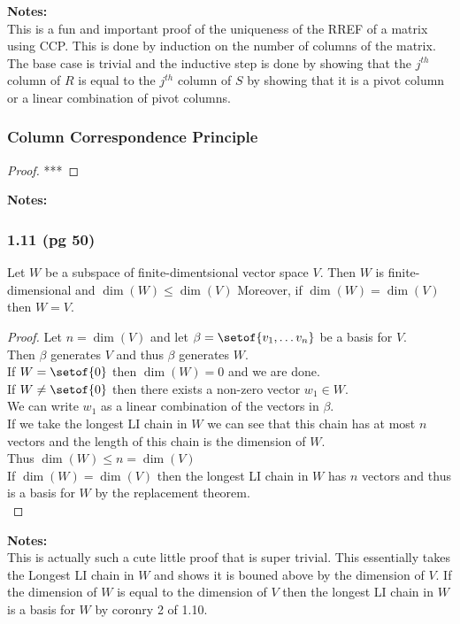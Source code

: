 \documentclass[answers,12pt,addpoints]{exam}
\begin{document}
\textbf{Notes:}\\
This is a fun and important proof of the uniqueness of the RREF of a matrix using CCP. This is done by induction on the number of columns of the matrix. The base case is trivial and the inductive step is done by showing that the $j^{th}$ column of $R$ is equal to the $j^{th}$ column of $S$ by showing that it is a pivot column or a linear combination of pivot columns.\\

\subsubsection{Column Correspondence Principle}
\begin{proof}
    ***
\end{proof}
\textbf{Notes:}\\


\subsubsection{1.11 (pg 50)}
Let $W$ be a subspace of finite-dimentsional vector space $V$. Then $W$ is finite-dimensional and $\dim(W) \leq \dim(V)$ Moreover, if $\dim(W) = \dim(V)$ then $W = V$.
\begin{proof}
    Let $n = \dim(V)$ and let $\beta = \setof{v_1, \dots v_n}$ be a basis for $V$.\\
    Then $\beta$ generates $V$ and thus $\beta$ generates $W$.\\
    If $W = \setof{0}$ then $\dim(W) = 0$ and we are done.\\
    If $W \neq \setof{0}$ then there exists a non-zero vector $w_1 \in W$.\\
    We can write $w_1$ as a linear combination of the vectors in $\beta$.\\
    If we take the longest LI chain in $W$ we can see that this chain has at most $n$ vectors and the length of this chain is the dimension of $W$.\\
    Thus $\dim(W) \leq n = \dim(V)$\\
    If $\dim(W) = \dim(V)$ then the longest LI chain in $W$ has $n$ vectors and thus is a basis for $W$ by the replacement theorem.\\
\end{proof}
\textbf{Notes:}\\
This is actually such a cute little proof that is super trivial. This essentially takes the Longest LI chain in $W$ and shows it is bouned above by the dimension of $V$. If the dimension of $W$ is equal to the dimension of $V$ then the longest LI chain in $W$ is a basis for $W$ by coronry 2 of 1.10.\\
\end{document}
